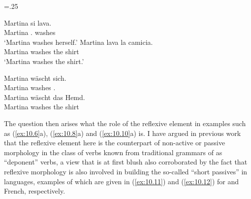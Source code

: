 \documentclass[output=paper]{langsci/langscibook}
\begin{document}
\ea \multicolsep=.25\baselineskip%
    \label{ex:10.5} 
    \begin{multicols}{2}
    \ea
	\gll  Martina  si      lava.\\
      Martina  \Refl.\Third{}  washes\\
    \glt  ‘Martina washes herself.’
    \ex
	\gll  Martina  lava    la camicia.\\
    Martina  washes  the shirt\\
    \glt ‘Martina washes the shirt.’
    \z\end{multicols}
\ex\label{ex:10.6} 
    \z
\ex \label{ex:10.7} 
    \begin{multicols}{2}
    \ea
	\gll  Martina  wäscht  sich.\\
        Martina  washes  \Refl.\Third{}\\
    \ex
	\gll  Martina  wäscht  das Hemd.\\
        Martina  washes  the shirt\\
    \z\end{multicols}
\z

\ea\label{ex:10.8} 
    \z
\z

\ea\label{ex:10.9}
    \z
\z

\ea\label{ex:10.10}
    \z
\z

The question then arises what the role of the reflexive element in examples
such as (\ref{ex:10.6}a), (\ref{ex:10.8}a) and (\ref{ex:10.10}a)
is. I have argued in previous work that the reflexive element here is the
counterpart of non-active or passive morphology in the class of verbs known
from traditional grammars of  as \enquote{deponent} verbs, a view that is
at first blush also corroborated by the fact that reflexive morphology is also
involved in building the so-called “short passives” in  languages,
examples of which are given in (\ref{ex:10.11}) and (\ref{ex:10.12})
for  and French, respectively.
\end{document}
